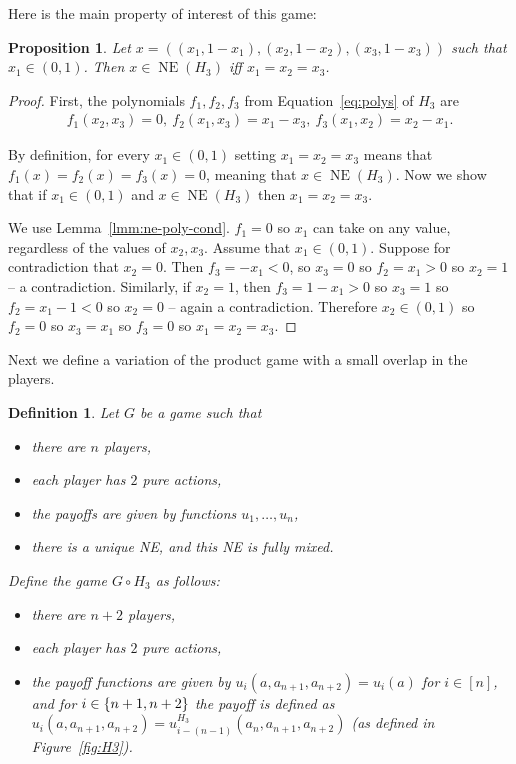 \documentclass[preprint,12pt,authoryear]{elsarticle}
\newtheorem{proposition}[theorem]{Proposition}
\newtheorem{definition}[theorem]{Definition}
\DeclarePairedDelimiter{\ios}{\{}{\}}
\newcommand{\s}{\ios*}
\DeclareMathOperator{\NE}{NE}
\begin{document}
Here is the main property of interest of this game:

\begin{proposition}\label{prop:H3-NE}
  Let $x=((x_1,1-x_1),(x_2,1-x_2),(x_3,1-x_3))$ such that $x_1\in(0,1)$. Then $x\in\NE(H_3)$ iff $x_1=x_2=x_3$.
\end{proposition}
\begin{proof}
  First, the polynomials $f_1,f_2,f_3$ from Equation~\ref{eq:polys} of $H_3$ are
  \begin{align*}
    f_1(x_2,x_3)=0,~f_2(x_1,x_3)=x_1-x_3,~f_3(x_1,x_2)=x_2-x_1.
  \end{align*}

  By definition, for every $x_1\in(0,1)$ setting $x_1=x_2=x_3$ means that $f_1(x)=f_2(x)=f_3(x)=0$, meaning that $x\in\NE(H_3)$. Now we show that if $x_1\in(0,1)$ and $x\in\NE(H_3)$ then $x_1=x_2=x_3$.

  We use Lemma~\ref{lmm:ne-poly-cond}. $f_1=0$ so $x_1$ can take on 
  any value, regardless of the values of $x_2,x_3$. Assume that $x_1\in(0,1)$.
  Suppose 
  for contradiction that $x_2=0$. Then $f_3=-x_1<0$, so $x_3=0$ so $f_2=x_1>0$ so $x_2=1$ 
  -- a contradiction. Similarly, if $x_2=1$, then $f_3=1-x_1>0$ so $x_3=1$ so $f_2=x_1-1<0$ 
  so $x_2=0$ -- again a contradiction. Therefore $x_2\in(0,1)$ so $f_2=0$ so $x_3=x_1$ so $f_3=0$ so $x_1=x_2=x_3$.
\end{proof}

Next we define a variation of the product game with a small overlap in the players.  

\begin{definition}
  Let $G$ be a game such that
  \begin{itemize}
    \item there are $n$ players,
    \item each player has $2$ pure actions,
    \item the payoffs are given by functions $u_1,\ldots,u_n$,
    \item there is a unique NE, and this NE is fully mixed.
  \end{itemize}
  Define the game $G\circ H_3$ as follows:
  \begin{itemize}
    \item there are $n+2$ players,
    \item each player has $2$ pure actions,
    \item the payoff functions are given by $u_i(a,a_{n+1},a_{n+2})=u_i(a)$ for $i\in[n]$, 
      and for $i\in\s{n+1,n+2}$ the payoff is defined as 
      $u_i(a,a_{n+1},a_{n+2})=u^{H_3}_{i-(n-1)}(a_n,a_{n+1},a_{n+2})$ (as defined in 
      Figure~\ref{fig:H3}).
  \end{itemize}
\end{definition}
\end{document}
